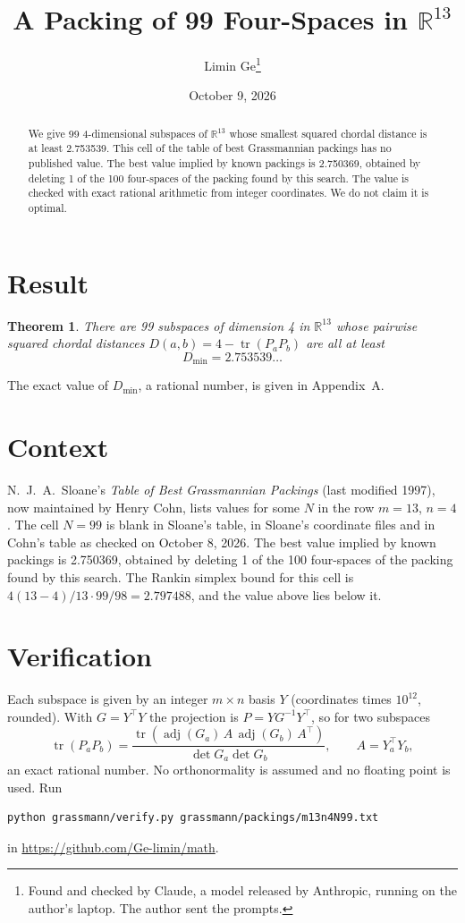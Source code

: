 \documentclass[11pt,a4paper]{article}
\title{A Packing of 99 Four-Spaces in $\mathbb{R}^{13}$}
\author{Limin Ge\thanks{Found and checked by Claude, a model released by Anthropic, running on the author's laptop. The author sent the prompts.}}
\date{October 9, 2026}
\newtheorem*{theorem}{Theorem}
\begin{document}
\maketitle
\begin{abstract}
We give 99 4-dimensional subspaces of $\mathbb{R}^{13}$ whose smallest squared chordal distance is at least 2.753539. This cell of the table of best Grassmannian packings has no published value. The best value implied by known packings is 2.750369, obtained by deleting 1 of the 100 four-spaces of the packing found by this search. The value is checked with exact rational arithmetic from integer coordinates. We do not claim it is optimal.
\end{abstract}

\section{Result}
\begin{theorem}
There are 99 subspaces of dimension 4 in $\mathbb{R}^{13}$ whose pairwise squared chordal distances $D(a,b) = 4 - \operatorname{tr}(P_aP_b)$ are all at least
\[ D_{\min} = 2.753539\ldots \]
\end{theorem}
The exact value of $D_{\min}$, a rational number, is given in Appendix~A.


\section{Context}
N.~J.~A.~Sloane's \emph{Table of Best Grassmannian Packings} (last modified 1997), now maintained by Henry Cohn, lists values for some $N$ in the row $m=13$, $n=4$. The cell $N=99$ is blank in Sloane's table, in Sloane's coordinate files and in Cohn's table as checked on October 8, 2026. The best value implied by known packings is 2.750369, obtained by deleting 1 of the 100 four-spaces of the packing found by this search. The Rankin simplex bound for this cell is $4(13-4)/13\cdot 99/98 = 2.797488$, and the value above lies below it.


\section{Verification}
Each subspace is given by an integer $m\times n$ basis $Y$ (coordinates times $10^{12}$, rounded). With $G=Y^\top Y$ the projection is $P=YG^{-1}Y^\top$, so for two subspaces
\[ \operatorname{tr}(P_aP_b)=\frac{\operatorname{tr}(\operatorname{adj}(G_a)\,A\,\operatorname{adj}(G_b)\,A^\top)}{\det G_a\det G_b},\qquad A=Y_a^\top Y_b, \]
an exact rational number. No orthonormality is assumed and no floating point is used. Run
\begin{verbatim}
python grassmann/verify.py grassmann/packings/m13n4N99.txt
\end{verbatim}
in \url{https://github.com/Ge-limin/math}.
\end{document}
